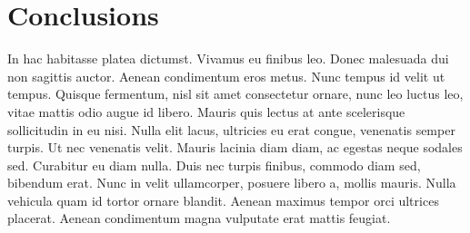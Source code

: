 \documentclass[10pt, a4paper, twocolumn]{article} %
\begin{document}
\section{Conclusions}

In hac habitasse platea dictumst. Vivamus eu finibus leo. Donec malesuada dui non sagittis auctor. Aenean condimentum eros metus. Nunc tempus id velit ut tempus. Quisque fermentum, nisl sit amet consectetur ornare, nunc leo luctus leo, vitae mattis odio augue id libero. Mauris quis lectus at ante scelerisque sollicitudin in eu nisi. Nulla elit lacus, ultricies eu erat congue, venenatis semper turpis. Ut nec venenatis velit. Mauris lacinia diam diam, ac egestas neque sodales sed. Curabitur eu diam nulla. Duis nec turpis finibus, commodo diam sed, bibendum erat. Nunc in velit ullamcorper, posuere libero a, mollis mauris. Nulla vehicula quam id tortor ornare blandit. Aenean maximus tempor orci ultrices placerat. Aenean condimentum magna vulputate erat mattis feugiat.


\printbibliography[title={Bibliography}] %

\end{document}
